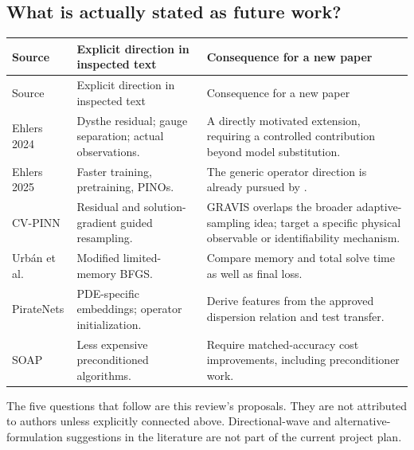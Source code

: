 \subsection{What is actually stated as future work?}
\begin{longtable}{@{}P{0.22\textwidth}P{0.32\textwidth}P{0.38\textwidth}@{}}
\toprule
Source & Explicit direction in inspected text & Consequence for a new paper \\
\midrule
\endfirsthead
\toprule
Source & Explicit direction in inspected text & Consequence for a new paper \\
\midrule
\endhead
Ehlers 2024 \cite{ehlers2024} & Dysthe residual; gauge separation;
actual observations. & A directly motivated extension, requiring a
controlled contribution beyond model substitution. \\
Ehlers 2025 \cite{ehlers2025} & Faster training, pretraining, PINOs. &
The generic operator direction is already pursued by \cite{wavepino}. \\
CV-PINN \cite{cvpinn} & Residual and solution-gradient guided resampling. &
GRAVIS overlaps the broader adaptive-sampling idea; target a specific
physical observable or identifiability mechanism. \\
Urb\'an et al. \cite{urban} & Modified limited-memory BFGS. &
Compare memory and total solve time as well as final loss. \\
PirateNets \cite{pirate} & PDE-specific embeddings; operator initialization. &
Derive features from the approved dispersion relation and test transfer. \\
SOAP \cite{soap} & Less expensive preconditioned algorithms. &
Require matched-accuracy cost improvements, including preconditioner work. \\
\bottomrule
\end{longtable}
The five questions that follow are this review's proposals. They are not
attributed to authors unless explicitly connected above. Directional-wave
and alternative-formulation suggestions in the literature are not part of
the current project plan.
